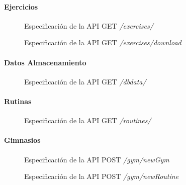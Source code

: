\documentclass[11pt,a4paper]{report}
\begin{document}
\paragraph{Ejercicios}
\begin{figure}[H]
	\centering
	
	\caption{Especificación de la API GET \textit{/exercises/}}
	\label{cod:getExe}
\end{figure}
\begin{figure}[H]
	\centering
	
	\caption{Especificación de la API GET \textit{/exercises/download}}
	\label{cod:getDow}
\end{figure}


\paragraph{Datos Almacenamiento}
\begin{figure}[H]
	\centering
	
	\caption{Especificación de la API GET \textit{/dbdata/}}
	\label{cod:getDbd}
\end{figure}
\paragraph{Rutinas}
\begin{figure}[H]
	\centering
	
	\caption{Especificación de la API GET \textit{/routines/}}
	\label{cod:getRou}
\end{figure}
\paragraph{Gimnasios}
\begin{figure}[H]
	\centering
	
	\caption{Especificación de la API POST \textit{/gym/newGym}}
	\label{cod:posGym}
\end{figure}
\begin{figure}[H]
	\centering
	
	\caption{Especificación de la API POST \textit{/gym/newRoutine}}
	\label{cod:posRut}
\end{figure}
\end{document}
